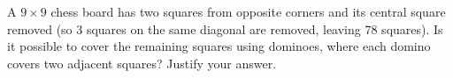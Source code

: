 A $9 \times 9$ chess board has two squares from opposite corners and its
central square removed (so 3 squares on the same diagonal are removed, leaving
78 squares). Is it possible to cover the remaining squares using dominoes,
where each domino covers two adjacent squares? Justify your answer.
